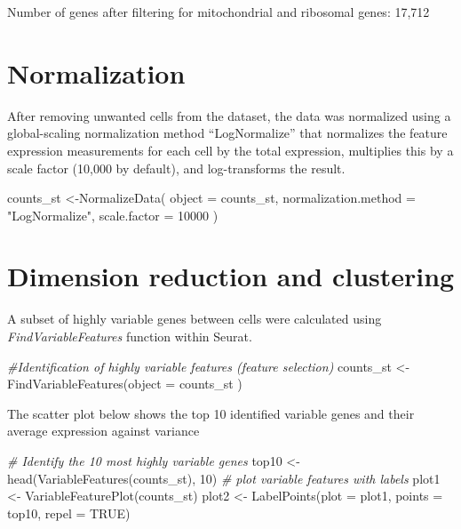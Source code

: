 \documentclass[
]{book}
\newenvironment{Shaded}{\begin{snugshade}}{\end{snugshade}}
\newcommand{\AttributeTok}[1]{\textcolor[rgb]{0.77,0.63,0.00}{#1}}
\newcommand{\CommentTok}[1]{\textcolor[rgb]{0.56,0.35,0.01}{\textit{#1}}}
\newcommand{\ConstantTok}[1]{\textcolor[rgb]{0.00,0.00,0.00}{#1}}
\newcommand{\DecValTok}[1]{\textcolor[rgb]{0.00,0.00,0.81}{#1}}
\newcommand{\FunctionTok}[1]{\textcolor[rgb]{0.00,0.00,0.00}{#1}}
\newcommand{\NormalTok}[1]{#1}
\newcommand{\OtherTok}[1]{\textcolor[rgb]{0.56,0.35,0.01}{#1}}
\newcommand{\StringTok}[1]{\textcolor[rgb]{0.31,0.60,0.02}{#1}}
\begin{document}
Number of genes after filtering for mitochondrial and ribosomal genes: 17,712

\hypertarget{normalization}{%
\section{Normalization}\label{normalization}}

After removing unwanted cells from the dataset, the data was normalized using a global-scaling normalization method ``LogNormalize'' that normalizes the feature expression measurements for each cell by the total expression, multiplies this by a scale factor (10,000 by default), and log-transforms the result.

\begin{Shaded}
\begin{Highlighting}[]
\NormalTok{counts\_st }\OtherTok{\textless{}{-}}\FunctionTok{NormalizeData}\NormalTok{(}
    \AttributeTok{object =}\NormalTok{ counts\_st,}
    \AttributeTok{normalization.method =} \StringTok{"LogNormalize"}\NormalTok{,}
    \AttributeTok{scale.factor =} \DecValTok{10000}
\NormalTok{  )}
\end{Highlighting}
\end{Shaded}

\hypertarget{dimension-reduction-and-clustering}{%
\section{Dimension reduction and clustering}\label{dimension-reduction-and-clustering}}

A subset of highly variable genes between cells were calculated using \emph{FindVariableFeatures} function within Seurat.

\begin{Shaded}
\begin{Highlighting}[]
\CommentTok{\#Identification of highly variable features (feature selection)}
\NormalTok{counts\_st }\OtherTok{\textless{}{-}} \FunctionTok{FindVariableFeatures}\NormalTok{(}\AttributeTok{object =}\NormalTok{ counts\_st )}
\end{Highlighting}
\end{Shaded}

The scatter plot below shows the top 10 identified variable genes and their average expression against variance

\begin{Shaded}
\begin{Highlighting}[]
\CommentTok{\# Identify the 10 most highly variable genes}
\NormalTok{top10 }\OtherTok{\textless{}{-}} \FunctionTok{head}\NormalTok{(}\FunctionTok{VariableFeatures}\NormalTok{(counts\_st), }\DecValTok{10}\NormalTok{)}
\CommentTok{\# plot variable features with labels}
\NormalTok{plot1 }\OtherTok{\textless{}{-}} \FunctionTok{VariableFeaturePlot}\NormalTok{(counts\_st)}
\NormalTok{plot2 }\OtherTok{\textless{}{-}} \FunctionTok{LabelPoints}\NormalTok{(}\AttributeTok{plot =}\NormalTok{ plot1, }\AttributeTok{points =}\NormalTok{ top10, }\AttributeTok{repel =} \ConstantTok{TRUE}\NormalTok{)}
\end{Highlighting}
\end{Shaded}
\end{document}
